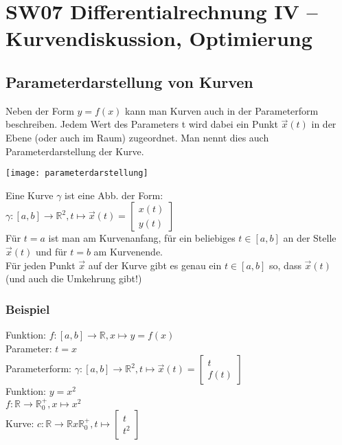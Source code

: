\documentclass[../main.tex]{subfiles}
\begin{document}

\chapter{SW07 Differentialrechnung IV -- Kurvendiskussion, Optimierung}
\section{Parameterdarstellung von Kurven}
Neben der Form $y=f(x)$ kann man Kurven auch in der Parameterform beschreiben. 
Jedem Wert des Parameters t wird dabei ein Punkt $\vec{x}(t)$ in der Ebene (oder auch im Raum) zugeordnet. 
Man nennt dies auch Parameterdarstellung der Kurve.

\begin{minipage}{0.5\textwidth}
    \texttt{[image: parameterdarstellung]}
\end{minipage} \hfill
\begin{minipage}{0.45\textwidth}
    Eine Kurve $\gamma$ ist eine Abb. der Form: \\ [7pt]
    $\gamma : [a,b] \to \mathbb{R}^2, t \mapsto \vec{x}(t)=
    \begin{bmatrix}
        x(t) \\
        y(t)
    \end{bmatrix}$ \\ [7pt]
    Für $t=a$ ist man am Kurvenanfang, für ein beliebiges $t \in [a,b]$ an der Stelle $\vec{x}(t)$ und für $t=b$ am Kurvenende. \\ [7pt]
    Für jeden Punkt $\vec{x}$ auf der Kurve gibt es genau ein $t \in [a,b]$ so, dass $\vec{x}(t)$ (und auch die Umkehrung gibt!)
\end{minipage}

\subsection{Beispiel}
Funktion: $f:[a,b] \to \mathbb{R}, x \mapsto y = f(x)$ \\
Parameter: $t=x$ \\
Parameterform: $\gamma : [a,b] \to \mathbb{R}^2, t \mapsto \vec{x}(t)=
\begin{bmatrix}
    t \\
    f(t)
\end{bmatrix}$ \\ [7pt]
Funktion: $y=x^2$ \\
$f: \mathbb{R} \to \mathbb{R}^+_0, x \mapsto x^2$ \\
Kurve: $c: \mathbb{R} \to \mathbb{R}x \mathbb{R}^+_0, t \mapsto
\begin{bmatrix}
    t \\
    t^2
\end{bmatrix}$
\end{document}

